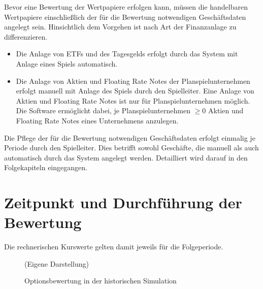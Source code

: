 \documentclass[12pt, a4paper]{article}
\begin{document}
Bevor eine Bewertung der Wertpapiere erfolgen kann, müssen die handelbaren Wertpapiere einschließlich der für die Bewertung notwendigen Geschäftsdaten angelegt sein. Hinsichtlich dem Vorgehen ist nach Art der Finanzanlage zu differenzieren.
\begin{itemize}
	\item Die Anlage von {ETFs} und des Tagesgelds erfolgt durch das System mit Anlage eines Spiels automatisch. 
	\item Die Anlage von Aktien und Floating Rate Notes der Planspielunternehmen erfolgt manuell mit Anlage des Spiels durch den Spielleiter. Eine Anlage von Aktien und Floating Rate Notes ist nur für Planspielunternehmen möglich. Die Software ermöglicht dabei, je Planspielunternehmen $\geq 0$ Aktien und Floating Rate Notes eines Unternehmens anzulegen. 
\end{itemize}
Die Pflege der für die Bewertung notwendigen Geschäftsdaten erfolgt einmalig je Periode durch den Spielleiter. Dies betrifft sowohl Geschäfte, die manuell als auch automatisch durch das System angelegt werden. Detailliert wird darauf in den Folgekapiteln eingegangen.

\section{Zeitpunkt und Durchführung der Bewertung}
\label{sec:zeitpunkt_und_durchfuehrung_der_bewertung}


Die rechnerischen Kurswerte gelten damit jeweils für die Folgeperiode.

\begin{figure}[htb]
	\centering
	\caption{Optionsbewertung in der historischen Simulation}
	\label{img:zeitstrahl_var}
	(Eigene Darstellung)
\end{figure}
\end{document}
